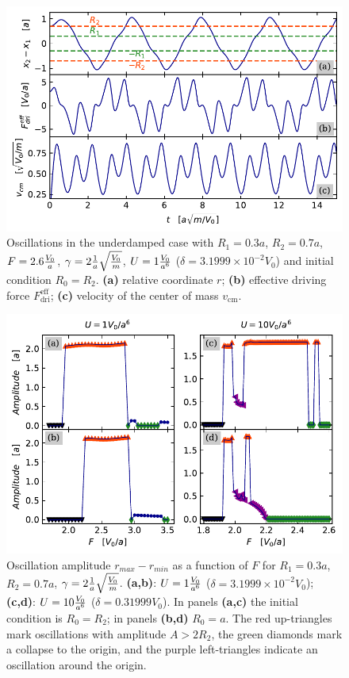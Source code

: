 \begin{figure}
\begin{center}
    \centering
    \includegraphics[width=1\linewidth]{Images/Underdamped.pdf}
    \caption{Oscillations in the underdamped case with $R_1 = 0.3 a$, $R_2 = 0.7 a$, $F = 2.6 \frac{V_0}{a}$, $\gamma = 2 \frac{1}{a}\sqrt{\frac{V_0}{m}}$, $ U = 1 \frac{V_0}{a^6}$ ($\delta = 3.1999 \times 10^{-2} V_0$) and initial condition $R_0=R_2$. \textbf{(a)} relative coordinate $r$; \textbf{(b)} effective driving force $F_\text{dri}^\text{eff}$; \textbf{(c)} velocity of the center of mass $v_\text{cm}$. }
    \label{Fig:Underdamped}
\end{center}
\end{figure}

\begin{figure}
\begin{center}
    \centering
    \includegraphics[width=1\linewidth]{Images/Underdamped_res_col.pdf}
    \caption{Oscillation amplitude $r_{max}-r_{min}$  as a function of $F$ for $R_1 = 0.3 a$, $R_2 = 0.7 a$, $\gamma = 2 \frac{1}{a}\sqrt{\frac{V_0}{m}}$. \textbf{(a,b)}:  $ U = 1 \frac{V_0}{a^6}$ ($\delta = 3.1999 \times 10^{-2} V_0$); \textbf{(c,d)}:  $ U = 10 \frac{V_0}{a^6}$ ($\delta = 0.31999  V_0$). In panels \textbf{(a,c)} the initial condition is $R_0=R_2$; in panels \textbf{(b,d)} $R_0=a$. The red up-triangles mark oscillations with amplitude $A > 2R_2$, the green diamonds mark a collapse to the origin, and the purple left-triangles indicate an oscillation around the origin.}
    \label{Fig:Underdamped_res}
\end{center}
\end{figure}

